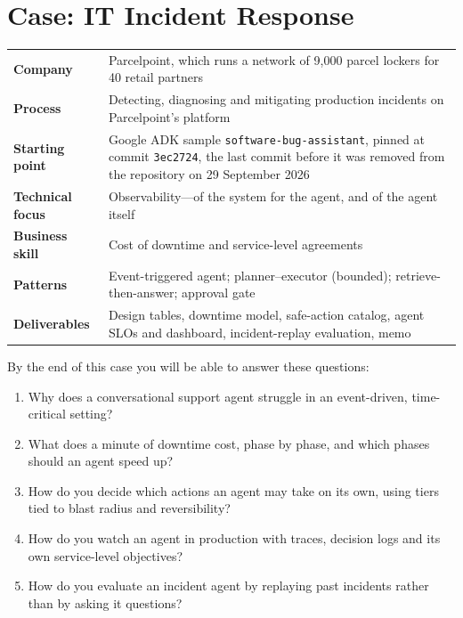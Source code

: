 
\chapter{Case: IT Incident Response}
\label{ch:case-incident}

\begin{caseglance}
\begin{tabularx}{\linewidth}{@{}>{\bfseries}p{3.4cm}X@{}}
Company & Parcelpoint, which runs a network of 9{,}000 parcel lockers for 40 retail partners \\
Process & Detecting, diagnosing and mitigating production incidents on Parcelpoint's platform \\
Starting point & Google ADK sample \texttt{software-bug-assistant}, pinned at commit \texttt{3ec2724}, the last commit before it was removed from the repository on 29 September 2026 \\
Technical focus & Observability---of the system for the agent, and of the agent itself \\
Business skill & Cost of downtime and service-level agreements \\
Patterns & Event-triggered agent; planner--executor (bounded); retrieve-then-answer; approval gate \\
Deliverables & Design tables, downtime model, safe-action catalog, agent SLOs and dashboard, incident-replay evaluation, memo
\end{tabularx}
\end{caseglance}

\begin{chapterquestions}
By the end of this case you will be able to answer these questions:
\begin{enumerate}[leftmargin=*,itemsep=2pt]
  \item Why does a conversational support agent struggle in an event-driven, time-critical setting?
  \item What does a minute of downtime cost, phase by phase, and which phases should an agent speed up?
  \item How do you decide which actions an agent may take on its own, using tiers tied to blast radius and reversibility?
  \item How do you watch an agent in production with traces, decision logs and its own service-level objectives?
  \item How do you evaluate an incident agent by replaying past incidents rather than by asking it questions?
\end{enumerate}
\end{chapterquestions}

